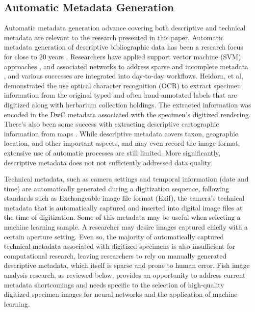 \documentclass[conference]{IEEEtran}
\begin{document}
\subsection{Automatic Metadata Generation}
Automatic metadata generation advance covering both descriptive and technical metadata are relevant to the research presented in this paper. Automatic metadata generation of descriptive bibliographic data has been a research focus for close to 20 years \cite{liddy2002automatic,greenberg2004metadata,cardinaels2005automating,paynter2005developing}. Researchers have applied support vector machine (SVM) approaches \cite{han2003automatic}, and associated networks to address sparse and incomplete metadata \cite{rodriguez2009automatic}, and various successes are integrated into day-to-day workflows. Heidorn, et al,\cite{heidorn2008automatic} demonstrated the use optical character recognition (OCR) to extract specimen information from the original typed and often hand-annotated labels that are digitized along with herbarium collection holdings. The extracted information was  encoded in the DwC metadata associated with the specimen's digitized rendering. There's also been some success with extracting descriptive cartographic information from maps \cite{manso2004automatic}. While descriptive metadata covers taxon, geographic location, and other important aspects, and may even record the image format; extensive use of automatic processes are still limited. More significantly, descriptive metadata does not not sufficiently addressed data quality.

Technical metadata, such as camera settings and temporal information (date and time) are automatically generated during a digitization sequence, following standards such as Exchangeable image file format (Exif)\cite{Exif}, the camera's technical metadata that is automatically captured and inserted into digital image files at the time of digitization. Some of this metadata may be useful when selecting a machine learning sample. A researcher may desire images captured chiefly with a certain aperture setting. Even so, the majority of automatically captured technical metadata associated with digitized specimens is also insufficient for computational research, leaving researchers to rely on manually generated descriptive metadata, which itself is sparse and prone to human error. Fish image analysis research, as reviewed below, provides an opportunity to address current metadata shortcomings and needs specific to the selection of high-quality digitized specimen images for neural networks and the application of machine learning.
\end{document}
